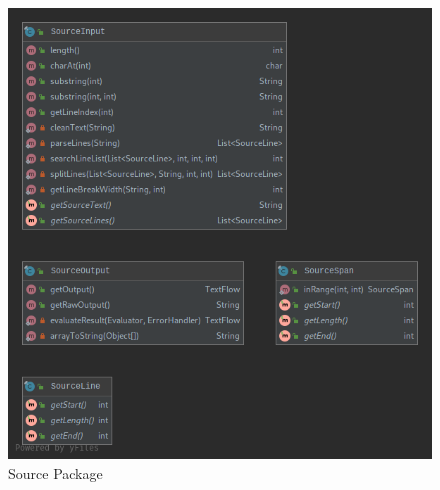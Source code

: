\documentclass[
]{report}
\begin{document}
\begin{appendices}
\begin{figure}
		\includegraphics[width=\textwidth]{source-package-diagram}
		\caption{Source Package}
		\label{fig:source-package-diagram}
	\end{figure}
	\begin{figure}
		\centering

\end{figure}
\end{appendices}
\end{document}

